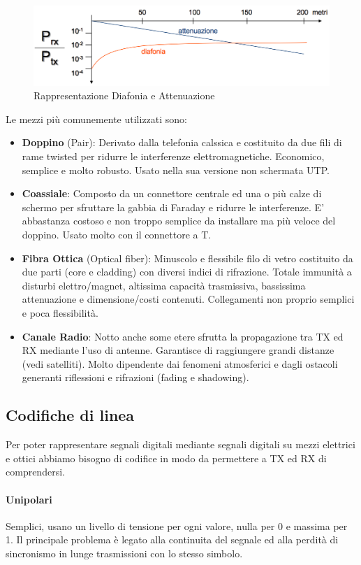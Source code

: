\documentclass[12pt]{article}
\begin{document}
\begin{figure}[!hp]
  \centering
  \includegraphics[width=\linewidth]{images/diaf_att.png}
  \caption{Rappresentazione Diafonia e Attenuazione}
  \label{fig:diaf_att}
\end{figure}
Le mezzi più comunemente utilizzati sono:
\begin{itemize}
  \item \textbf{Doppino} (Pair): Derivato dalla telefonia calssica e costituito da due fili di rame twisted per ridurre le interferenze elettromagnetiche. Economico, semplice e molto robusto. Usato nella sua versione non schermata UTP.
  \item \textbf{Coassiale}: Composto da un connettore centrale ed una o più calze di schermo per sfruttare la gabbia di Faraday e ridurre le interferenze. E' abbastanza costoso e non troppo semplice da installare ma più veloce del doppino. Usato molto con il connettore a T.
  \item \textbf{Fibra Ottica} (Optical fiber): Minuscolo e flessibile filo di vetro costituito da due parti (core e cladding) con diversi indici di rifrazione. Totale immunità a disturbi elettro/magnet, altissima capacità trasmissiva, bassissima attenuazione e dimensione/costi contenuti. Collegamenti non proprio semplici e poca flessibilità.
  \item \textbf{Canale Radio}: Notto anche some etere sfrutta la propagazione tra TX ed RX mediante l'uso di antenne. Garantisce di raggiungere grandi distanze (vedi satelliti). Molto dipendente dai fenomeni atmosferici e dagli ostacoli generanti riflessioni e rifrazioni (fading e shadowing).
\end{itemize}

\subsection{Codifiche di linea}
Per poter rappresentare segnali digitali mediante segnali digitali su mezzi elettrici e ottici abbiamo bisogno di codifice in modo da permettere a TX ed RX di comprendersi.

\paragraph{Unipolari}
Semplici, usano un livello di tensione per ogni valore, nulla per 0 e massima per 1. Il principale problema è legato alla continuita del segnale ed alla perdità di sincronismo in lunge trasmissioni con lo stesso simbolo.
\end{document}
